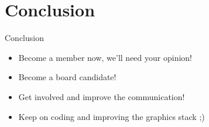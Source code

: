 \documentclass{beamer}
\begin{document}
	\section{Conclusion}
		\begin{frame}
			\begin{block}{Conclusion}
				\begin{itemize}
					\item Become a member now, we'll need your opinion!
					\item Become a board candidate!
					\item Get involved and improve the communication!
					\item Keep on coding and improving the graphics stack ;)
				\end{itemize}
			\end{block}
		\end{frame}
\end{document}

